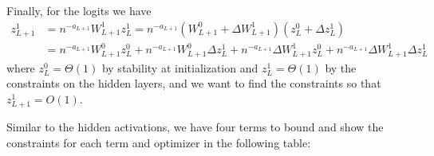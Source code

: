 \documentclass{article}
\theoremstyle{plain}
\theoremstyle{definition}
\theoremstyle{remark}
\begin{document}
\begingroup
\renewcommand{\arraystretch}{2.5}
\begin{table}[h!]
\centering
{}
\end{table}
\endgroup
\FloatBarrier
Finally, for the logits we have
\begin{align*}
    z_{L+1}^1 &= n^{-a_{L+1}}W_{L+1}^1 z_{L}^1 = n^{-a_{L+1}}(W_{L+1}^0 + \Delta W_{L+1}^1)(z_{L}^0 + \Delta z_{L}^1)\\
    &= n^{-a_{L+1}}W_{L+1}^0 z_{L}^0 + n^{-a_{L+1}}W_{L+1}^0 \Delta z_{L}^1 + n^{-a_{L+1}}\Delta W_{L+1}^1 z_{L}^0 + n^{-a_{L+1}}\Delta W_{L+1}^1 \Delta z_{L}^1
\end{align*}
where $z_L^0 = \Theta(1)$ by stability at initialization and $z_L^1 = \Theta(1)$ by the constraints on the hidden layers, and we want to find the constraints so that $z_{L+1}^1 = O(1)$.

Similar to the hidden activations, we have four terms to bound and show the constraints for each term and optimizer in the following table:
\end{document}
